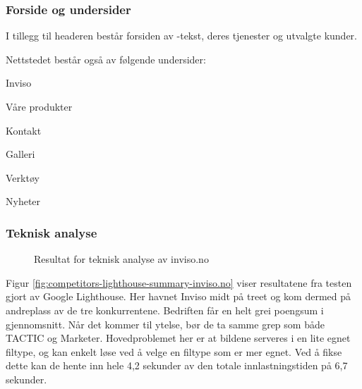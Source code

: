 \subsubsection{Forside og undersider}
I tillegg til headeren består forsiden av -tekst, deres tjenester og utvalgte kunder. 

Nettstedet består også av følgende undersider:
\begin{compactitem}
\item Inviso
\item Våre produkter
\item Kontakt
\item Galleri
\item Verktøy
\item Nyheter
\end{compactitem}

\subsubsection{Teknisk analyse}

\begin{figure}[H]
    \begin{center}
        
        \label{fig:competitors-tech_analysis-inviso.no}
        \caption{Resultat for teknisk analyse av inviso.no}
    \end{center}
\end{figure}

Figur \ref{fig:competitors-lighthouse-summary-inviso.no} viser resultatene fra testen gjort av Google Lighthouse. Her havnet Inviso midt på treet og kom dermed på andreplass av de tre konkurrentene. Bedriften får en helt grei poengsum i gjennomsnitt. Når det kommer til ytelse, bør de ta samme grep som både TACTIC og Marketer. Hovedproblemet her er at bildene serveres i en lite egnet filtype, og kan enkelt løse ved å velge en filtype som er mer egnet. Ved å fikse dette kan de hente inn hele 4,2 sekunder av den totale innlastningstiden på 6,7 sekunder.

